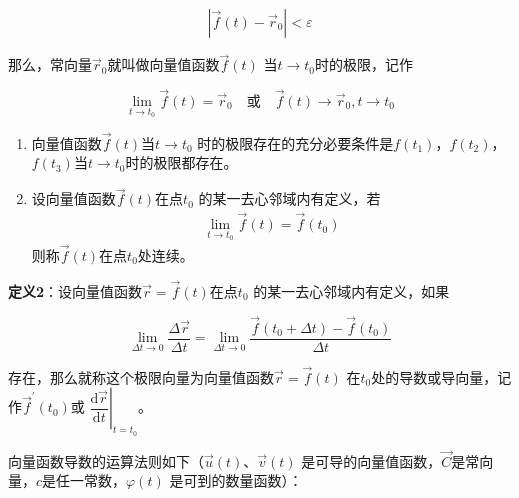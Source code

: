 \documentclass[12pt, a4paper]{article}
\numberwithin{equation}{section}
\newcommand{\rmd}{\mathrm{d}}
\begin{document}
    \[
        \left|\overrightarrow{f}\left(t\right)-\overrightarrow{r}_0\right| < \varepsilon
    \]

    那么，常向量\(\overrightarrow{r}_0\)就叫做向量值函数\(\overrightarrow{f}\left(t\right)\)
    当\(t \rightarrow t_0\)时的极限，记作
    
    \begin{equation}
        \lim_{t \rightarrow t_0} \overrightarrow{f}(t) = \overrightarrow{r}_0 \quad 
        \text{或} \quad \overrightarrow{f}(t) \rightarrow \overrightarrow{r}_0, t \rightarrow t_0
    \end{equation}

    \begin{enumerate}
        \item 向量值函数\(\overrightarrow{f}\left(t\right)\)当\(t \rightarrow t_0\)
            时的极限存在的充分必要条件是\(f\left(t_1\right)\)，\(f\left(t_2\right)\)，
            \(f\left(t_3\right)\)当\(t \rightarrow t_0\)时的极限都存在。
        \item 设向量值函数\(\overrightarrow{f}\left(t\right)\)在点\(t_0\)
            的某一去心邻域内有定义，若
            \begin{align}
                \lim_{t \rightarrow t_0}\overrightarrow{f}\left(t\right) = \overrightarrow{f}\left(t_0\right)
            \end{align}
            则称\(\overrightarrow{f}\left(t\right)\)在点\(t_0\)处连续。
    \end{enumerate}

    \textbf{定义2}：设向量值函数\(\overrightarrow{r} = \overrightarrow{f}\left(t\right)\)在点\(t_0\)
    的某一去心邻域内有定义，如果
    
    \begin{equation}
        \lim _{\Delta t \rightarrow 0} \frac{\Delta \overrightarrow{r}}{\Delta t}=
        \lim _{\Delta t \rightarrow 0} \frac{\overrightarrow{f}\left(t_0+\Delta t\right)-\overrightarrow{f}\left(t_0\right)}{\Delta t}
    \end{equation}

    存在，那么就称这个极限向量为向量值函数\(\overrightarrow{r} = \overrightarrow{f}\left(t\right)\)
    在\(t_0\)处的导数或导向量，记作\(\overrightarrow{f}^{\prime}\left(t_0\right)\)或
    \(\left.\dfrac{\rmd \overrightarrow{r}}{\rmd t}\right|_{t=t_0}\)。

    向量函数导数的运算法则如下（\(\overrightarrow{u}\left(t\right)\)、\(\overrightarrow{v}\left(t\right)\)
    是可导的向量值函数，\(\overrightarrow{C}\)是常向量，\(c\)是任一常数，\(\varphi\left(t\right)\)
    是可到的数量函数）：
\end{document}
